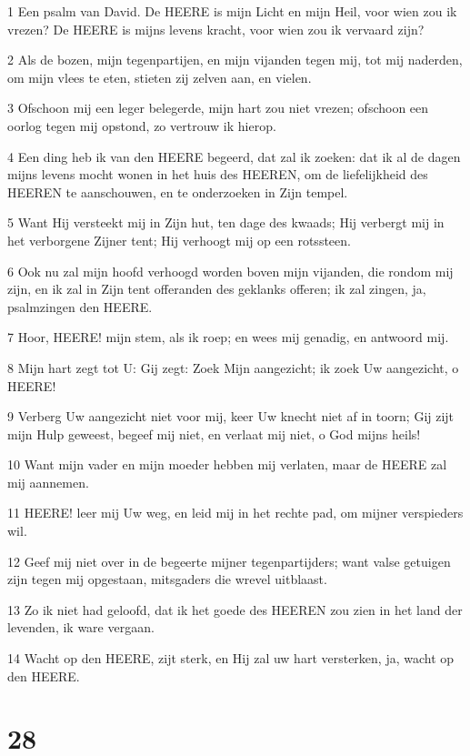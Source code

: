 \par 1 Een psalm van David. De HEERE is mijn Licht en mijn Heil, voor wien zou ik vrezen? De HEERE is mijns levens kracht, voor wien zou ik vervaard zijn?
\par 2 Als de bozen, mijn tegenpartijen, en mijn vijanden tegen mij, tot mij naderden, om mijn vlees te eten, stieten zij zelven aan, en vielen.
\par 3 Ofschoon mij een leger belegerde, mijn hart zou niet vrezen; ofschoon een oorlog tegen mij opstond, zo vertrouw ik hierop.
\par 4 Een ding heb ik van den HEERE begeerd, dat zal ik zoeken: dat ik al de dagen mijns levens mocht wonen in het huis des HEEREN, om de liefelijkheid des HEEREN te aanschouwen, en te onderzoeken in Zijn tempel.
\par 5 Want Hij versteekt mij in Zijn hut, ten dage des kwaads; Hij verbergt mij in het verborgene Zijner tent; Hij verhoogt mij op een rotssteen.
\par 6 Ook nu zal mijn hoofd verhoogd worden boven mijn vijanden, die rondom mij zijn, en ik zal in Zijn tent offeranden des geklanks offeren; ik zal zingen, ja, psalmzingen den HEERE.
\par 7 Hoor, HEERE! mijn stem, als ik roep; en wees mij genadig, en antwoord mij.
\par 8 Mijn hart zegt tot U: Gij zegt: Zoek Mijn aangezicht; ik zoek Uw aangezicht, o HEERE!
\par 9 Verberg Uw aangezicht niet voor mij, keer Uw knecht niet af in toorn; Gij zijt mijn Hulp geweest, begeef mij niet, en verlaat mij niet, o God mijns heils!
\par 10 Want mijn vader en mijn moeder hebben mij verlaten, maar de HEERE zal mij aannemen.
\par 11 HEERE! leer mij Uw weg, en leid mij in het rechte pad, om mijner verspieders wil.
\par 12 Geef mij niet over in de begeerte mijner tegenpartijders; want valse getuigen zijn tegen mij opgestaan, mitsgaders die wrevel uitblaast.
\par 13 Zo ik niet had geloofd, dat ik het goede des HEEREN zou zien in het land der levenden, ik ware vergaan.
\par 14 Wacht op den HEERE, zijt sterk, en Hij zal uw hart versterken, ja, wacht op den HEERE.

\chapter{28}

